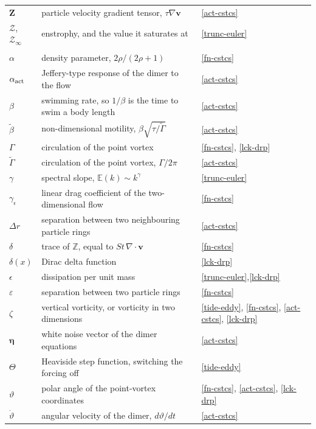 \begin{longtable}{@{}p{}p{}p{}@{}}
$\mathbf{Z}$ & particle velocity gradient tensor, $\tau\nabla\boldsymbol{v}$ & \ref{act-cstcs} \\
$\mathcal{Z}$, $\mathcal{Z}_\infty$ & enstrophy, and the value it saturates at & \ref{trunc-euler} \\
\addlinespace
\midrule
\multicolumn{3}{@{}l}{\textbf{Greek letters}} \\
\addlinespace
$\alpha$ & density parameter, $2\rho/(2\rho+1)$ & \ref{fn-cstcs} \\
$\alpha_{\rm act}$ & Jeffery-type response of the dimer to the flow & \ref{act-cstcs} \\
$\beta$ & swimming rate, so $1/\beta$ is the time to swim a body length & \ref{act-cstcs} \\
$\tilde{\beta}$ & non-dimensional motility, $\beta\sqrt{\tau/\tilde{\Gamma}}$ & \ref{act-cstcs} \\
$\Gamma$ & circulation of the point vortex & \ref{fn-cstcs}, \ref{lck-drp} \\
$\tilde{\Gamma}$ & circulation of the point vortex, $\Gamma/2\pi$ & \ref{act-cstcs} \\
$\gamma$ & spectral slope, $\mathbb{E}(k)\sim k^\gamma$ & \ref{trunc-euler} \\
$\gamma_\epsilon$ & linear drag coefficient of the two-dimensional flow & \ref{fn-cstcs} \\
$\Delta r$ & separation between two neighbouring particle rings & \ref{act-cstcs} \\
$\delta$ & trace of $\mathbb{Z}$, equal to $St\,\nabla\cdot\boldsymbol{v}$ & \ref{fn-cstcs} \\
$\delta(x)$ & Dirac delta function & \ref{lck-drp} \\
$\epsilon$ & dissipation per unit mass & \ref{trunc-euler},\ref{lck-drp} \\
$\varepsilon$ & separation between two particle rings & \ref{fn-cstcs} \\
$\zeta$ & vertical vorticity, or vorticity in two dimensions & \ref{tide-eddy}, \ref{fn-cstcs}, \ref{act-cstcs}, \ref{lck-drp} \\
$\boldsymbol{\eta}$ & white noise vector of the dimer equations & \ref{act-cstcs} \\
$\Theta$ & Heaviside step function, switching the forcing off & \ref{tide-eddy} \\
$\vartheta$ & polar angle of the point-vortex coordinates & \ref{fn-cstcs}, \ref{act-cstcs}, \ref{lck-drp} \\
$\dot{\vartheta}$ & angular velocity of the dimer, $d\vartheta/dt$ & \ref{act-cstcs} \\

\end{longtable}
